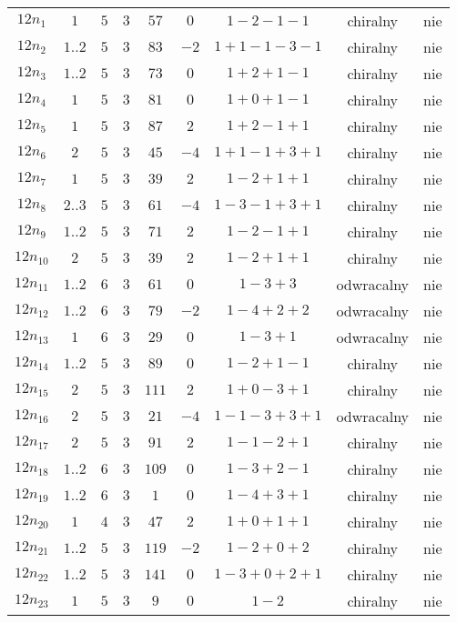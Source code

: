 \begin{longtable}{ccccccccc}
$12n_{1}$ & $1$ & $5$ & $3$ & $57$ & $0$ & $1-2-1-1$ & chiralny & nie \\
$12n_{2}$ & $1..2$ & $5$ & $3$ & $83$ & $-2$ & $1+1-1-3-1$ & chiralny & nie \\
$12n_{3}$ & $1..2$ & $5$ & $3$ & $73$ & $0$ & $1+2+1-1$ & chiralny & nie \\
$12n_{4}$ & $1$ & $5$ & $3$ & $81$ & $0$ & $1+0+1-1$ & chiralny & nie \\
$12n_{5}$ & $1$ & $5$ & $3$ & $87$ & $2$ & $1+2-1+1$ & chiralny & nie \\
$12n_{6}$ & $2$ & $5$ & $3$ & $45$ & $-4$ & $1+1-1+3+1$ & chiralny & nie \\
$12n_{7}$ & $1$ & $5$ & $3$ & $39$ & $2$ & $1-2+1+1$ & chiralny & nie \\
$12n_{8}$ & $2..3$ & $5$ & $3$ & $61$ & $-4$ & $1-3-1+3+1$ & chiralny & nie \\
$12n_{9}$ & $1..2$ & $5$ & $3$ & $71$ & $2$ & $1-2-1+1$ & chiralny & nie \\
$12n_{10}$ & $2$ & $5$ & $3$ & $39$ & $2$ & $1-2+1+1$ & chiralny & nie \\
$12n_{11}$ & $1..2$ & $6$ & $3$ & $61$ & $0$ & $1-3+3$ & odwracalny & nie \\
$12n_{12}$ & $1..2$ & $6$ & $3$ & $79$ & $-2$ & $1-4+2+2$ & odwracalny & nie \\
$12n_{13}$ & $1$ & $6$ & $3$ & $29$ & $0$ & $1-3+1$ & odwracalny & nie \\
$12n_{14}$ & $1..2$ & $5$ & $3$ & $89$ & $0$ & $1-2+1-1$ & chiralny & nie \\
$12n_{15}$ & $2$ & $5$ & $3$ & $111$ & $2$ & $1+0-3+1$ & chiralny & nie \\
$12n_{16}$ & $2$ & $5$ & $3$ & $21$ & $-4$ & $1-1-3+3+1$ & odwracalny & nie \\
$12n_{17}$ & $2$ & $5$ & $3$ & $91$ & $2$ & $1-1-2+1$ & chiralny & nie \\
$12n_{18}$ & $1..2$ & $6$ & $3$ & $109$ & $0$ & $1-3+2-1$ & chiralny & nie \\
$12n_{19}$ & $1..2$ & $6$ & $3$ & $1$ & $0$ & $1-4+3+1$ & chiralny & nie \\
$12n_{20}$ & $1$ & $4$ & $3$ & $47$ & $2$ & $1+0+1+1$ & chiralny & nie \\
$12n_{21}$ & $1..2$ & $5$ & $3$ & $119$ & $-2$ & $1-2+0+2$ & chiralny & nie \\
$12n_{22}$ & $1..2$ & $5$ & $3$ & $141$ & $0$ & $1-3+0+2+1$ & chiralny & nie \\
$12n_{23}$ & $1$ & $5$ & $3$ & $9$ & $0$ & $1-2$ & chiralny & nie \\

\end{longtable}
